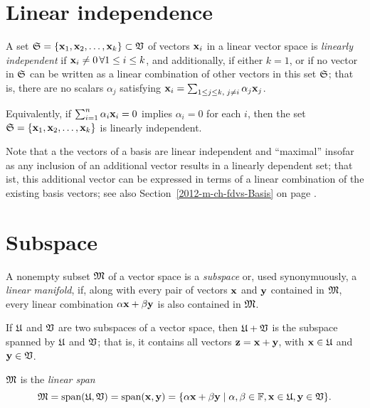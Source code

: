 \section{Linear independence}

A set ${\frak S}=\{
{\bf x}_1,
{\bf x}_2,
\ldots ,
{\bf x}_k\} \subset {\frak V}$
of vectors ${\bf x}_i$ in a linear vector space
is {\em linearly independent}
if ${\bf x}_i\neq 0\,\forall 1\le i\le k$,
and additionally, if either $k=1$,
or if no vector in ${\frak S}$ can be written as a linear combination of other vectors in this set ${\frak S}$;
that is, there are no scalars $\alpha_j$ satisfying
 ${\bf x}_i=\sum_{1\le j \le k, \; j\neq i}\alpha_j {\bf x}_j$.

Equivalently, if $\sum_{i=1}^n \alpha_i {\bf x}_i = 0$
 implies $\alpha_i =0$ for each $i$, then the set
${\frak S}=\{
{\bf x}_1,
{\bf x}_2,
\ldots ,
{\bf x}_k\}  $ is linearly independent.


Note that a the vectors of a basis are linear independent and ``maximal''
insofar as any inclusion of an additional vector results in a linearly dependent set;
that ist, this additional vector can be expressed in terms of a linear combination of the
existing basis vectors; see also Section~\ref{2012-m-ch-fdvs-Basis} on page \pageref{2012-m-ch-fdvs-Basis}.

\section{Subspace}
\label{2011-m-subspace}
A nonempty subset ${\frak M}$ of a vector space is a {\em subspace}
or, used synonymuously,
a {\em linear manifold},
 if, along with every pair of vectors ${\bf x}$   and  ${\bf y}$
 contained in  ${\frak M}$,
 every linear combination
$\alpha {\bf x} + \beta {\bf y}$ is also contained in  ${\frak M}$.

If
${\frak U}$
and
${\frak V}$
are two subspaces of a vector space,
then
${\frak U}+{\frak V}$
is the subspace spanned by
${\frak U}$
and
${\frak V}$;
that is,
it contains all vectors
${\bf z}={\bf x}+{\bf y}$, with
${\bf x}\in {\frak U}$  and
${\bf y}\in {\frak V}$.

${\frak M}$ is the {\em linear span}
\begin{equation}
{\frak M}
= \textrm{span}({\frak U},{\frak V})
= \textrm{span}({\bf x},{\bf y}) =
\{\alpha {\bf x} +\beta {\bf y}\mid \alpha ,\beta \in {\Bbb F}, {\bf x} \in {\frak U},
{\bf y} \in {\frak V}\}.
\end{equation}


